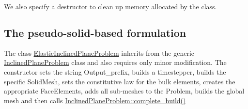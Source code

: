 We also specify a destructor to clean up memory allocated by the class.\hypertarget{index_elastic_probe}{}\subsection{The pseudo-\/solid-\/based formulation}\label{index_elastic_probe}
The class {\ttfamily \hyperlink{classElasticInclinedPlaneProblem}{Elastic\+Inclined\+Plane\+Problem}} inherits from the generic {\ttfamily \hyperlink{classInclinedPlaneProblem}{Inclined\+Plane\+Problem}} class and also requires only minor modification. The constructor sets the string {\ttfamily Output\+\_\+prefix}, builds a timestepper, builds the specific {\ttfamily Solid\+Mesh}, sets the constitutive law for the bulk elements, creates the appropriate {\ttfamily Face\+Elements}, adds all sub-\/meshes to the {\ttfamily Problem}, builds the global mesh and then calls {\ttfamily \hyperlink{classInclinedPlaneProblem_ae44e360be4a46e1343c3960c3a43380f}{Inclined\+Plane\+Problem\+::complete\+\_\+build()}} 
